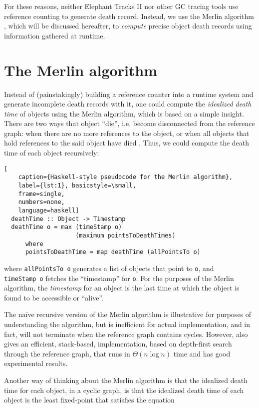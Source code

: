 For these reasons, neither Elephant Tracks II nor other GC tracing tools \citep{MemInsight, ElephantTracks}
use reference counting to generate death record. Instead, we use the Merlin algorithm \citep{Merlin}, which
will be discussed hereafter, to \emph{compute} precise object death records using information gathered
at runtime.

\section{The Merlin algorithm}
Instead of (painstakingly) building a reference counter into a runtime system and generate incomplete death
records with it, one could compute the \emph{idealized death time} of objects using the Merlin algorithm, which
is based on a simple insight. There are two ways that object ``die'', i.e. become disconnected from the reference
graph: when there are no more references to the object, or when all objects that hold references to the said object
have died \citep{Merlin, ElephantTracks}. Thus, we could compute the death time of each object recursively:
\newpage
\begin{lstlisting}[
    caption={Haskell-style pseudocode for the Merlin algorithm},
    label={lst:1}, basicstyle=\small,
    frame=single,
    numbers=none,
    language=haskell]
  deathTime :: Object -> Timestamp
  deathTime o = max (timeStamp o)
                    (maximum pointsToDeathTimes)
      where
      pointsToDeathTime = map deathTime (allPointsTo o)
\end{lstlisting}
where \lstinline{allPointsTo o} generates a list of objects that point to \lstinline{o}, and\\
\lstinline{timeStamp o} fetches the ``timestamp'' for \lstinline{o}. For the purposes of the Merlin algorithm,
the \emph{timestamp} for an object is the last time at which the object is found to be accessible or ``alive''.

The na\"{i}ve recursive version of the Merlin algorithm is illustrative for purposes of understanding the
algorithm, but is inefficient for actual implementation, and in fact, will not terminate when the reference graph
contains cycles. However, \cite{Merlin} also gives an efficient, stack-based, implementation, based
on depth-first search through the reference graph, that runs in $\Theta(n \log n)$ time and has good
experimental results.

Another way of thinking about the Merlin algorithm is that the idealized death time for each object, in a cyclic
graph, is that the idealized death time of each object is the least fixed-point that satisfies the equation

